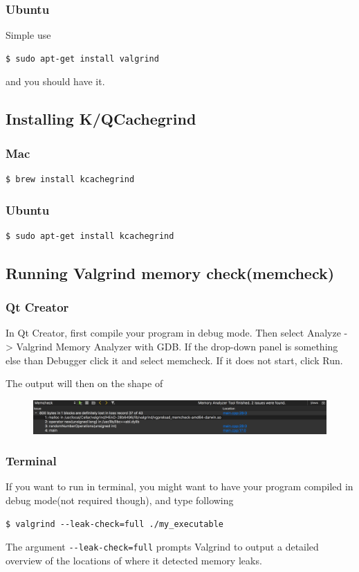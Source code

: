 \documentclass[11pt]{article}
\begin{document}
\subsubsection{Ubuntu}
Simple use
\begin{lstlisting}
$ sudo apt-get install valgrind
\end{lstlisting}
and you should have it.

\subsection{Installing K/QCachegrind}
\subsubsection{Mac}
\begin{lstlisting}
$ brew install kcachegrind
\end{lstlisting}

\subsubsection{Ubuntu}
\begin{lstlisting}
$ sudo apt-get install kcachegrind
\end{lstlisting}

\subsection{Running Valgrind memory check(memcheck)}
\subsubsection{Qt Creator}
In Qt Creator, first compile your program in debug mode. Then select Analyze -> Valgrind Memory Analyzer with GDB. If the drop-down panel is something else than Debugger click it and select memcheck. If it does not start, click Run.

The output will then on the shape of
\begin{figure}[H]
    \centering
    \includegraphics[width=\textwidth]{figures/valgrind-qt/valgrind}
\end{figure}

\subsubsection{Terminal}
If you want to run in terminal, you might want to have your program compiled in debug mode(not required though), and type following 
\begin{lstlisting}
$ valgrind --leak-check=full ./my_executable
\end{lstlisting}
The argument \verb|--leak-check=full| prompts Valgrind to output a detailed overview of the locations of where it detected memory leaks.
\end{document}
